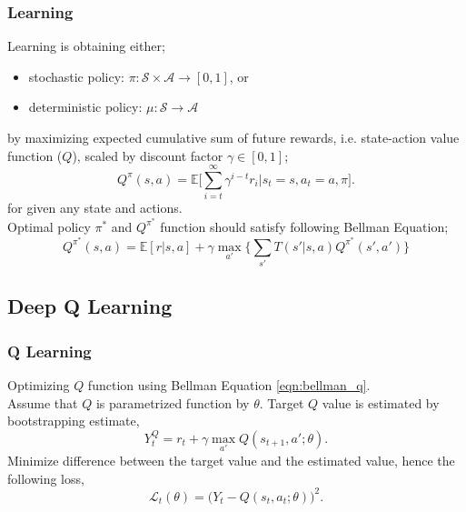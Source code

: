 \documentclass{beamer}
\begin{document}
\begin{frame}
\frametitle{Learning}
Learning is obtaining either;
\begin{itemize}
	\item stochastic policy: $\pi: \mathcal{S}\times\mathcal{A} \rightarrow [0,1]$, or
	\item deterministic policy: $\mu: \mathcal{S}\rightarrow\mathcal{A}$
\end{itemize}
by maximizing expected cumulative sum of future rewards, i.e. state-action value function ($Q$), scaled by discount factor $\gamma \in [0,1]$;
\begin{equation}
Q^{\pi}(s,a) = \mathbb{E}\bigg[\sum_{i=t}^{\infty} \gamma^{i-t} r_i|s_t=s, a_t=a, \pi\bigg]. %
\end{equation}
for given any state and actions. \\
Optimal policy $\pi^*$ and $Q^{\pi^*}$ function should satisfy following Bellman Equation;
\begin{equation}
\label{eqn:bellman_q}
Q^{\pi^*}(s,a) = \mathbb{E}[r|s,a] + \gamma \max_{a'} \Big\{ \sum_{s'} T(s'|s,a) Q^{\pi^*}(s',a') \Big\}
\end{equation}
\end{frame}


\subsection{Deep Q Learning}

\begin{frame}
\frametitle{Q Learning}
Optimizing $Q$ function using Bellman Equation \ref{eqn:bellman_q}.\\
Assume that $Q$ is parametrized function by $\theta$.
Target $Q$ value is estimated by bootstrapping estimate, 
\begin{equation}
\label{eqn:q_target}
Y_t^Q = r_t + \gamma \max_{a'} Q(s_{t+1},a';\theta).
\end{equation}
Minimize difference between the target value and the estimated value, hence the following loss,
\begin{equation}
\label{eqn:q_loss}
\mathcal{L}_t(\theta) = \big( Y_t - Q(s_t,a_t;\theta) \big) ^ 2.
\end{equation}
\end{frame}
\end{document}
